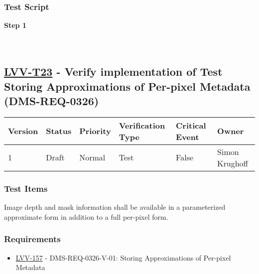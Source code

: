 \hypertarget{test-script-112}{%
\subsubsection{Test Script}\label{test-script-112}}

\textbf{Step 1}\\
~\\
~\\

\hypertarget{lvv-t23---verify-implementation-of-test-storing-approximations-of-per-pixel-metadata-dms-req-0326}{%
\subsection{\texorpdfstring{\href{https://jira.lsstcorp.org/secure/Tests.jspa\#/testCase/LVV-T23}{LVV-T23}
- Verify implementation of Test Storing Approximations of Per-pixel
Metadata
(DMS-REQ-0326)}{LVV-T23 - Verify implementation of Test Storing Approximations of Per-pixel Metadata (DMS-REQ-0326)}}\label{lvv-t23---verify-implementation-of-test-storing-approximations-of-per-pixel-metadata-dms-req-0326}}

\begin{longtable}[]{@{}llllll@{}}
\toprule
Version & Status & Priority & Verification Type & Critical Event &
Owner\tabularnewline
\midrule
\endhead
1 & Draft & Normal & Test & False & Simon Krughoff\tabularnewline
\bottomrule
\end{longtable}

\hypertarget{test-items-113}{%
\subsubsection{Test Items}\label{test-items-113}}

Image depth and mask information shall be available in a parameterized
approximate form in addition to a full per-pixel form.

\hypertarget{requirements-113}{%
\subsubsection{Requirements}\label{requirements-113}}

\begin{itemize}
\tightlist
\item
  \href{https://jira.lsstcorp.org/browse/LVV-157}{LVV-157} -
  DMS-REQ-0326-V-01: Storing Approximations of Per-pixel Metadata
\end{itemize}

